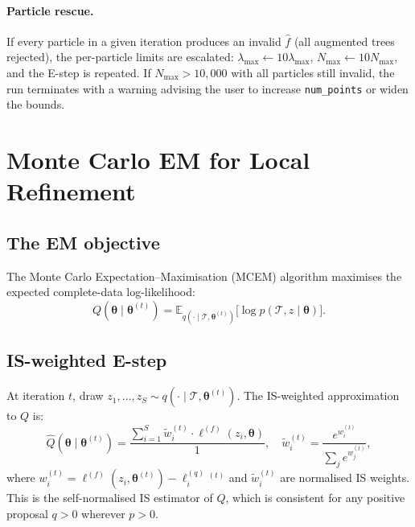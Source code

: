 \documentclass[12pt,a4paper]{article}
\newcommand{\obs}{\mathcal{T}}
\newcommand{\pars}{\bm{\theta}}
\newcommand{\fhat}{\widehat{f}}
\newcommand{\E}{\mathbb{E}}
\newcommand{\logf}{\ell^{(f)}}
\newcommand{\logq}{\ell^{(q)}}
\newcommand{\lw}{w}
\begin{document}
\paragraph{Particle rescue.}
If every particle in a given iteration produces an invalid $\fhat$ (all
augmented trees rejected), the per-particle limits are escalated:
$\lambda_{\max} \leftarrow 10\lambda_{\max}$,
$N_{\max} \leftarrow 10 N_{\max}$,
and the E-step is repeated. If $N_{\max} > 10{,}000$ with all particles
still invalid, the run terminates with a warning advising the user to
increase \texttt{num\_points} or widen the bounds.

\section{Monte Carlo EM for Local Refinement}\label{sec:MCEM}

\subsection{The EM objective}

The Monte Carlo Expectation--Maximisation (MCEM) algorithm
\citep{wei1990monte,levine2001implementations} maximises the expected
complete-data log-likelihood:
\begin{equation}\label{eq:Qfunc}
  Q(\pars \mid \pars^{(t)}) = \E_{q(\cdot\mid\obs,\pars^{(t)})}\!
    \bigl[\log p(\obs, z \mid \pars)\bigr].
\end{equation}

\subsection{IS-weighted E-step}

At iteration $t$, draw $z_1,\ldots,z_S \sim q(\cdot\mid\obs,\pars^{(t)})$.
The IS-weighted approximation to $Q$ is:
\begin{equation}\label{eq:Qhat}
  \hat{Q}(\pars \mid \pars^{(t)})
  = \frac{\displaystyle\sum_{i=1}^{S}
          \tilde{w}_i^{(t)} \cdot \logf(z_i, \pars)}
         {1},
  \quad
  \tilde{w}_i^{(t)} = \frac{e^{\lw_i^{(t)}}}{\sum_j e^{\lw_j^{(t)}}},
\end{equation}
where $\lw_i^{(t)} = \logf(z_i,\pars^{(t)}) - \logq_i^{(t)}$ and
$\tilde{w}_i^{(t)}$ are normalised IS weights. This is the self-normalised
IS estimator of $Q$, which is consistent for any positive proposal
$q > 0$ wherever $p > 0$.
\end{document}
